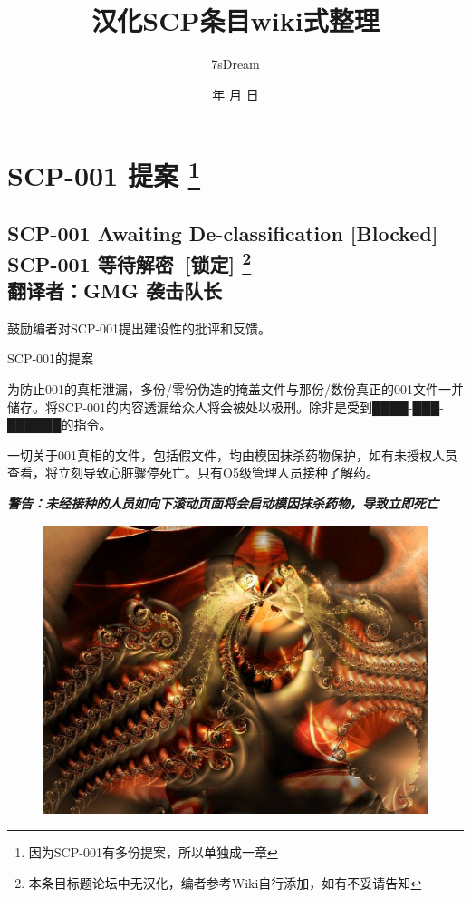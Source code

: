 \documentclass[openany,a4paper]{book} %
\renewcommand{\today}{\number\year 年 \number\month 月 \number\day 日} %
\newcounter{mychapter} %
\begin{document}
\title{汉化SCP条目wiki式整理}
\author{7sDream}
\date{\today}
\maketitle
\tableofcontents
\mainmatter
\part[SCP-001]{SCP-001 提案 \protect\footnote{因为SCP-001有多份提案，所以单独成一章}}
\setcounter{mychapter}{0}
\chapter[SCP-001 等待解密]{SCP-001 Awaiting De-classification [Blocked]\\SCP-001 等待解密\ [锁定] \protect\footnote{本条目标题论坛中无汉化，编者参考Wiki自行添加，如有不妥请告知} \\ 翻译者：GMG 袭击队长}\label{chap:SCP-001-0}

鼓励编者对SCP-001提出建设性的批评和反馈。\vspace{12pt}

{\color{red}SCP-001的提案}\vspace{24pt}

为防止001的真相泄漏，多份/零份伪造的掩盖文件与那份/数份真正的001文件一并储存。将SCP-001的内容透漏给众人将会被处以极刑。除非是受到████-███-██████的指令。\vspace{12pt}

一切关于001真相的文件，包括假文件，均由模因抹杀药物保护，如有未授权人员查看，将立刻导致心脏骤停死亡。只有O5级管理人员接种了解药。\vspace{12pt}

\textit{\textbf{警告：未经接种的人员如向下滚动页面将会启动模因抹杀药物，导致立即死亡}}
\clearpage

\begin{figure}[H]
  \centering
  \includegraphics[width = 480pt]{Pic/SCP-000.jpg}
\end{figure}
\end{document}
